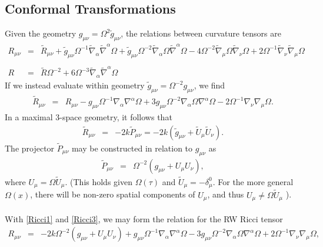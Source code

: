 \documentclass[10pt,letterpaper]{article}
\numberwithin{equation}{section}
\begin{document}
\begin{appendices}
\section{Conformal Transformations}
Given the geometry $g_{\mu\nu} = \Omega^2\tilde g_{\mu\nu}$, the relations between curvature tensors are
\begin{eqnarray}
R_{\mu\nu} &=& \tilde R_{\mu \nu } + \tilde{g}_{\mu \nu } \Omega^{-1} \tilde{\nabla}_{\alpha }\tilde{\nabla}^{\alpha }\Omega + \tilde{g}_{\mu \nu } \Omega^{-2} \tilde{\nabla}_{\alpha }\Omega \tilde{\nabla}^{\alpha }\Omega - 4 \Omega^{-2} \tilde{\nabla}_{\mu }\Omega \tilde{\nabla}_{\nu }\Omega + 2 \Omega^{-1} \tilde{\nabla}_{\nu }\tilde{\nabla}_{\mu }\Omega 
\label{Ricci0}
\\ \nonumber\\
R &=& \tilde R \Omega^{-2} + 6 \Omega^{-3} \tilde{\nabla}_{\alpha }\tilde{\nabla}^{\alpha }\Omega 
\end{eqnarray}
If we instead evaluate within geometry $\tilde g_{\mu\nu} = \Omega^{-2}g_{\mu\nu}$, we find
\begin{eqnarray}
\tilde R_{\mu\nu} &=& R_{\mu \nu } -  g_{\mu \nu } \Omega^{-1} \nabla_{\alpha }\nabla^{\alpha }\Omega + 3 g_{\mu \nu } \Omega^{-2} \nabla_{\alpha }\Omega \nabla^{\alpha }\Omega - 2 \Omega^{-1} \nabla_{\nu }\nabla_{\mu }\Omega.
\label{Ricci1}
\end{eqnarray}
In a maximal 3-space geometry, it follows that
\begin{eqnarray}
\tilde R_{\mu\nu} &=&-2k \tilde P_{\mu\nu}  = -2k(\tilde g_{\mu\nu} +\tilde U_\mu \tilde U_\nu).
\label{Ricci3}
\end{eqnarray}
The projector $\tilde P_{\mu\nu}$ may be constructed in relation to $g_{\mu\nu}$ as
\begin{eqnarray}
\tilde P_{\mu\nu} &=& \Omega^{-2}(g_{\mu\nu}+U_\mu U_\nu),
\end{eqnarray}
where $U_\mu = \Omega \tilde U_\mu$. (This holds given $\Omega(\tau)$ and $\tilde U_{\mu}= - \delta_\mu^0$. For the more general $\Omega(x)$, there will be non-zero spatial components of $U_\mu$, and thus $U_\mu \ne \Omega \tilde U_\mu$ ).
\\ \\
With \eqref{Ricci1} and \eqref{Ricci3}, we may form the relation for the RW Ricci tensor
\begin{eqnarray}
R_{\mu\nu} &=& -2k\Omega^{-2}(g_{\mu\nu}+U_\mu U_\nu)
+  g_{\mu \nu } \Omega^{-1} \nabla_{\alpha }\nabla^{\alpha }\Omega - 3 g_{\mu \nu } \Omega^{-2} \nabla_{\alpha }\Omega \nabla^{\alpha }\Omega + 2 \Omega^{-1} \nabla_{\nu }\nabla_{\mu }\Omega,

\end{eqnarray}
\end{appendices}
\end{document}
